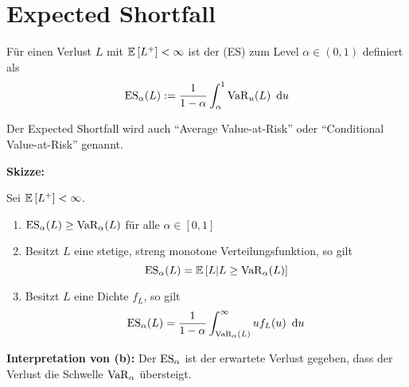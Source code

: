 \section{Expected Shortfall}
\begin{*definition}
	Für einen Verlust $L$ mit $\mathbb{E} \left[ L^+ \right] < \infty$ ist der  (ES) zum Level $\alpha \in (0,1)$ definiert als
	\begin{equation*}
	\operatorname{ES}_\alpha(L) \mathrel{:=} \frac{1}{1-\alpha} \int_\alpha^1 \operatorname{VaR}_u(L) \enskip \mathrm{d}u
	\end{equation*}
\end{*definition}

\begin{*bemerkung_inline}
	Der Expected Shortfall wird auch \enquote{Average Value-at-Risk} oder \enquote{Conditional Value-at-Risk} genannt.
\end{*bemerkung_inline}

\textbf{Skizze:} %

\pagebreak

\begin{theorem}
	Sei $\mathbb{E} \left[ L^+ \right] < \infty$.
	\begin{enumerate}[label=(\alph*), nolistsep]
		\item $\operatorname{ES}_\alpha(L) \ge \operatorname{VaR}_\alpha(L)$ für alle $\alpha \in [0,1]$
		\item Besitzt $L$ eine stetige, streng monotone Verteilungsfunktion, so gilt
		\begin{equation*}
			\operatorname{ES}_\alpha(L) = \mathbb{E} \left[ L | L \ge \operatorname{VaR}_\alpha(L) \right]
		\end{equation*}
		\item Besitzt $L$ eine Dichte $f_L$, so gilt
		\begin{equation*}
			\operatorname{ES}_\alpha(L) = \frac{1}{1-\alpha} \int_{\operatorname{VaR}_\alpha(L)}^\infty u f_L(u) \enskip \mathrm{d}u
		\end{equation*}
	\end{enumerate}
\end{theorem}

\textbf{Interpretation von (b):} Der $\operatorname{ES}_\alpha$ ist der erwartete Verlust gegeben, dass der Verlust die Schwelle $\operatorname{VaR}_\alpha$ übersteigt.


